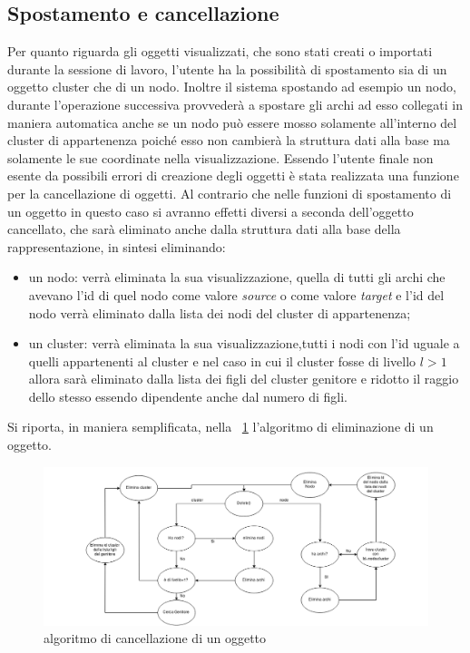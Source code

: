 {\subsection{Spostamento e cancellazione}
Per quanto riguarda gli oggetti visualizzati, che sono stati creati o importati durante la sessione di lavoro, l'utente ha la possibilità di spostamento sia di un oggetto cluster che di un nodo. Inoltre il sistema spostando ad esempio un nodo, durante l'operazione successiva provvederà a spostare gli archi ad esso collegati in maniera automatica anche se un nodo può essere mosso solamente all'interno del cluster di appartenenza poiché esso non cambierà la struttura dati alla base ma solamente le sue coordinate nella visualizzazione.
Essendo l'utente finale non esente da possibili errori di creazione degli oggetti è stata realizzata una funzione per la cancellazione di oggetti. Al contrario che nelle funzioni di spostamento di un oggetto in questo caso si avranno effetti diversi a seconda dell'oggetto cancellato, che sarà eliminato anche dalla struttura dati alla base della rappresentazione, in sintesi eliminando:
\begin{itemize}
	\item un nodo: verrà eliminata la sua visualizzazione, quella di tutti gli archi che avevano l'id di quel nodo come valore \textit{source} o come valore \textit{target} e l'id del nodo verrà eliminato dalla lista dei nodi del cluster di appartenenza;
	\item un cluster: verrà eliminata la sua visualizzazione,tutti i nodi con l'id uguale a quelli appartenenti al cluster e nel caso in cui il cluster fosse di livello $l>1$ allora sarà eliminato dalla lista dei figli del cluster genitore e ridotto il raggio dello stesso essendo dipendente anche dal numero di figli.
\end{itemize}
Si riporta, in maniera semplificata, nella \figurename~\ref{fig:delete} l'algoritmo di eliminazione di un oggetto.
\begin{figure}[!htb]
	\begin{center}
		\includegraphics[width=0.8 \linewidth]{figure/delete}
	\end{center}
	\caption{algoritmo di cancellazione di un oggetto\label{fig:delete}}
\end{figure}
}
